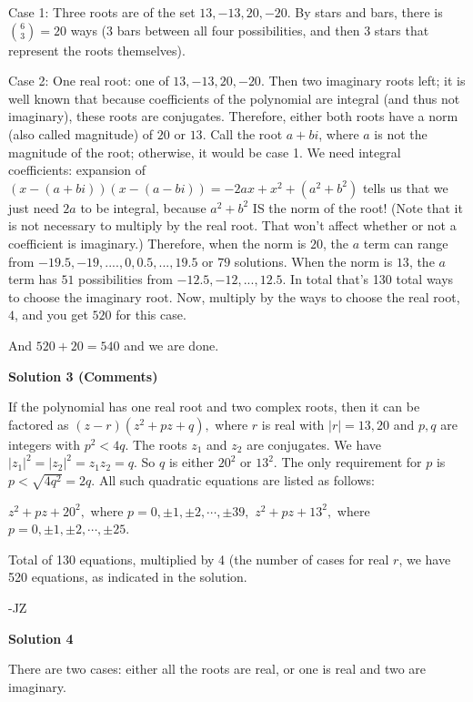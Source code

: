 \begin{enumerate}
 Case 1: Three roots are of the set ${13, -13, 20, -20}$. By stars and bars, there is $\binom{6}{3}=20$ ways (3 bars between all four possibilities, and then 3 stars that represent the roots themselves).

 Case 2: One real root: one of $13, -13, 20, -20$. Then two imaginary roots left; it is well known that because coefficients of the polynomial are integral (and thus not imaginary), these roots are conjugates. Therefore, either both roots have a norm (also called magnitude) of $20$ or $13$. Call the root $a+bi$, where $a$ is not the magnitude of the root; otherwise, it would be case 1. We need integral coefficients: expansion of $(x-(a+bi))(x-(a-bi))=-2ax+x^2+(a^2+b^2)$ tells us that we just need $2a$ to be integral, because $a^2+b^2$ IS the norm of the root! (Note that it is not necessary to multiply by the real root. That won't affect whether or not a coefficient is imaginary.) Therefore, when the norm is $20$, the $a$ term can range from $-19.5, -19, ...., 0, 0.5, ..., 19.5$ or $79$ solutions. When the norm is $13$, the $a$ term has $51$ possibilities from $-12.5, -12, ..., 12.5$. In total that's 130 total ways to choose the imaginary root. Now, multiply by the ways to choose the real root, $4$, and you get $520$ for this case.

 And $520+20=540$ and we are done.

 



\textbf{Solution 3 (Comments)}

If the polynomial has one real root and two complex roots, then it can be factored as $(z-r)(z^2+pz+q),$ where $r$ is real with $|r|=13,20$ and $p,q$ are integers with $p^2 <4q.$ The roots $z_1$ and $z_2$ are conjugates. We have $|z_1|^2=|z_2|^2=z_1z_2=q.$ So $q$ is either $20^2$ or $13^2$. The only requirement for $p$ is $p<\sqrt{4q^2}=2q.$ All such quadratic equations are listed as follows:

 $z^2+pz+20^2,$ where $p=0,\pm1,\pm2,\cdots,\pm 39,$
$z^2+pz+13^2,$ where $p=0,\pm1,\pm2,\cdots,\pm 25$.

 Total of 130 equations, multiplied by 4 (the number of cases for real $r$, we have 520 equations, as indicated in the solution.

 -JZ

 



\textbf{Solution 4}

There are two cases: either all the roots are real, or one is real and two are imaginary.


\end{enumerate}
